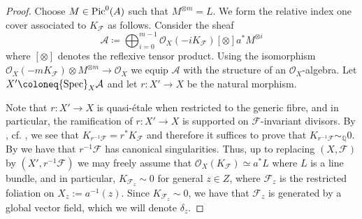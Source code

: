 \documentclass[12pt]{amsart}
\newcommand{\cal}[1]{\mathcal{#1}}
\begin{document}
\begin{proof}

Choose $M\in  {\rm Pic}^0(A)$ such that $M^{\otimes m} = L$.
We form the relative index one cover associated to $K_{\mathcal F}$ as follows.
Consider the sheaf 
\[\mathcal A \coloneq \bigoplus_{i = 0}^{m-1} \mathcal O_X(-iK_{\mathcal F}) [\otimes] a^*M^{\otimes i}\]
where $[\otimes]$ denotes the reflexive tensor product.
Using the isomorphism $\mathcal O_X(-mK_{\mathcal F})\otimes M^{\otimes m} \to \mathcal O_X$ we equip $\mathcal A$ with the structure of an
$\mathcal O_X$-algebra.  Let $X' \coloneq {\rm Spec}_X\mathcal A$ and let $r\colon X' \to X$ be the natural morphism.



Note that $r\colon X' \to X$ is quasi-\'etale when restricted to the generic fibre, and in particular, the ramification of $r\colon X' \to X$ is supported on $\mathcal F$-invariant divisors.  
By \cite[Lemma 3.4]{Druel19}, cf. \cite[Proposition 2.20]{CS20}, we see that $K_{r^{-1}\mathcal F} = r^*K_{\mathcal F}$ and  therefore it suffices to prove that $K_{r^{-1}\mathcal F} \sim_{\mathbb Q} 0$. By \cite[Lemma 2.8]{CS20} we have that $r^{-1}\cal F$ has canonical singularities.
Thus, up to replacing $(X, \mathcal F)$ by $(X', r^{-1}\mathcal F)$ we may freely assume that $\mathcal O_X(K_{\mathcal F}) \simeq a^*L$ where $L$ is a line bundle, and in particular, $K_{\mathcal F_z} \sim 0$ for general $z \in Z$, where $\mathcal F_z$ is the restricted foliation on $X_z :=a^{-1}(z)$.  Since $K_{\mathcal F_z} \sim 0$, we have that $\cal F_z$ is generated by a global vector field, which we will denote $\delta_z$.


\end{proof}
\end{document}

